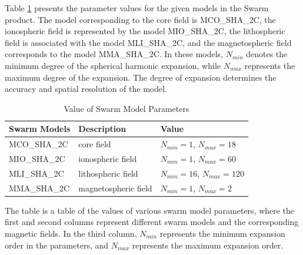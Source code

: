 \documentclass[3p,authoryear,preprint,12pt]{elsarticle}
\begin{document}
Table \ref{tab:SHparam} presents the parameter values for the given models in the Swarm product. The model corresponding to the core field is MCO\_SHA\_2C, the ionospheric field is represented by the model MIO\_SHA\_2C, the lithospheric field is associated with the model MLI\_SHA\_2C, and the magnetospheric field corresponds to the model MMA\_SHA\_2C. In these models, $N_{min}$ denotes the minimum degree of the spherical harmonic expansion, while $N_{max}$ represents the maximum degree of the expansion. The degree of expansion determines the accuracy and spatial resolution of the model.
\begin{table}[htbp]
	\caption{Value of Swarm Model Parameters}
	\label{tab:SHparam}
	\centering
	\begin{threeparttable}
	\begin{tabular}{lll}
		\toprule
		\textbf{Swarm Models}&\textbf{ Description} & \textbf{Value} \\
		\midrule
		MCO\_SHA\_2C & core field&  $N_{min}=1$, $N_{max}=18$ \\ 
		MIO\_SHA\_2C&  ionospheric field&  $N_{min}=1$, $N_{max}=60$ \\
		MLI\_SHA\_2C&   lithospheric field&  $N_{min}=16$, $N_{max}=120$ \\
		MMA\_SHA\_2C &  magnetospheric field&  $N_{min}=1$, $N_{max}=2$ \\
		\bottomrule
	\end{tabular}
	\begin{tablenotes}
		\item {The table is a table of the values ​​of various swarm model parameters, where the first and second columns represent different swarm models and the corresponding magnetic fields. In the third column, $N_{min}$ represents the minimum expansion order in the parameters, and $N_{max}$ represents the maximum expansion order.}
	\end{tablenotes}
	\end{threeparttable}
\end{table}
\end{document}
